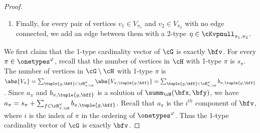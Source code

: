 \begin{proof}
\begin{enumerate}
            We apply the swapping procedure to eliminate parallel edges as well.
            Suppose that there are parallel edges $e_1$ and $e_2$
            between $v_1 \in V_{\pi_1}$ and $v_2 \in V_{\pi_2}$ with 2-types $\eta_1 \in \cKvpf_{\pi_1, \pi_2}$ for $e_1$ and $\eta_2$ for $e_2$.
            We consider two cases:
            \begin{itemize}
            \item 
                If there is a vertex $u_2 \in V_{\pi_2}$ such that there is no edges between $v_1$ and $u_2$,
                then we remove $e_1$ and add an edge between $v_1$ and $u_2$ with 2-types $\eta_1$.
            \item 
                Otherwise, suppose that there is no such $u_2$,
                which implies that for every vertex $u \in V_{\pi_2}$,
                there exists an edge $e_3$ between $v_1$ and $u$.
                Because there are at most $2K^\varphi(2K^\varphi+1)^2$ edges
                between $V_{\pi_1}$ and $V_{\pi_2}$,
                we can find $u_1 \in V_{\pi_1}$ and $u_2 \in V_{\pi_2}$
                such that no edges exists between them,
                and there exists an edge $e_3$ between $v_1$ and $u_2$ with type $\eta_3 \in \cKvpb_{\pi_1, \pi_2}$. 
                We then remove the edges $e_1$ and $e_3$
                and fresh edges $(v_1, u_2)$ with 2-type $\eta_1$ and $(v_2, u_2)$ with 2-type $\eta_3$.
            \end{itemize}
            For both cases, the swapping procedure preserves the number of edges connected to vertices with specific 2-types
            but reduces the number of parallel edges by 1,
            We can repeat it until all parallel edges are eliminated.

        \item
            Finally, for every pair of vertices $v_1 \in V_{\pi_1}$ and $v_2 \in V_{\pi_2}$ 
            with no edge connected,
            we add an edge between them with a 2-type  $\eta \in \cKvpnull_{\pi_1, \pi_2}$.
    \end{enumerate}

    We first claim that the 1-type cardinality vector of $\cG$ is exactly $\bfv$.
    For every $\pi \in \onetypes^\varphi$,
    recall that the number of vertices in $\cH$ with 1-type $\pi$ is $s_\pi$.
    The number of vertices in $\cG \setminus \cH$ with 1-type $\pi$ is
    $\abs{V_\pi} = \sum_{\tuple{g, \bff} \in \cB^\varphi_{\pi, \cH}} \abs{V_{\pi, \tuple{g, \bff}}} = \sum_{\tuple{g, \bff} \in \cB^\varphi_{\pi, \cH}} b_{\pi, \tuple{g, \bff}}$.
    Since $a_\pi$ and $b_{\pi, \tuple{g, \bff}}$ is a solution of $\summ_{\cH}(\bfx, \bfy)$,
    we have $a_\pi = s_\pi + \sum_{f \in \cB^\varphi_{\pi, \cH}} b_{\pi, \tuple{g, \bff}}$.
    Recall that $a_\pi$ is the $i^{th}$ component of $\bfv$, where $i$ is the index of $\pi$ in the  ordering of $\onetypes^\varphi$.
    Thus the 1-type cardinality vector of $\cG$ is exactly $\bfv$.


\end{proof}
